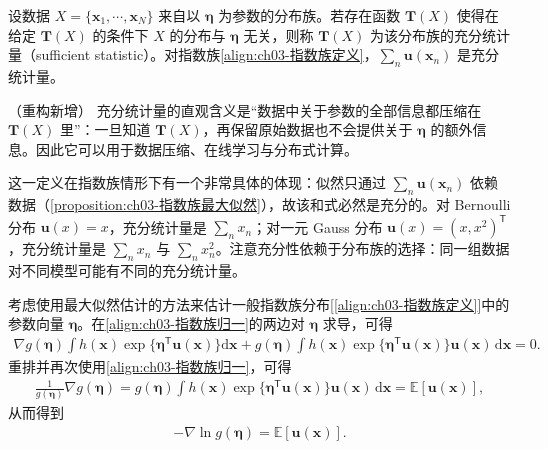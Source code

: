 \documentclass[../../main.tex]{subfiles}
\begin{document}
\begin{definition}[充分统计量]\label{definition:ch03-充分统计量}
设数据 $X=\{\boldsymbol{x}_1,\cdots,\boldsymbol{x}_N\}$ 来自以 $\boldsymbol{\eta}$ 为参数的分布族。若存在函数 $\boldsymbol{T}(X)$ 使得在给定 $\boldsymbol{T}(X)$ 的条件下 $X$ 的分布与 $\boldsymbol{\eta}$ 无关，则称 $\boldsymbol{T}(X)$ 为该分布族的充分统计量（sufficient statistic）。对指数族\eqref{align:ch03-指数族定义}，$\sum_{n}\boldsymbol{u}(\boldsymbol{x}_n)$ 是充分统计量。
\end{definition}

\begin{remark}（重构新增）
充分统计量的直观含义是“数据中关于参数的全部信息都压缩在 $\boldsymbol{T}(X)$ 里”：一旦知道 $\boldsymbol{T}(X)$，再保留原始数据也不会提供关于 $\boldsymbol{\eta}$ 的额外信息。因此它可以用于数据压缩、在线学习与分布式计算。

这一定义在指数族情形下有一个非常具体的体现：似然只通过 $\sum_n\boldsymbol{u}(\boldsymbol{x}_n)$ 依赖数据（\cref{proposition:ch03-指数族最大似然}），故该和式必然是充分的。对 Bernoulli 分布 $\boldsymbol{u}(x)=x$，充分统计量是 $\sum_n x_n$；对一元 Gauss 分布 $\boldsymbol{u}(x)=(x,x^{2})^{\mathsf{T}}$，充分统计量是 $\sum_n x_n$ 与 $\sum_n x_n^{2}$。注意充分性依赖于分布族的选择：同一组数据对不同模型可能有不同的充分统计量。
\end{remark}

考虑使用最大似然估计的方法来估计一般指数族分布[\eqref{align:ch03-指数族定义}]中的参数向量 $\boldsymbol{\eta}$。在\eqref{align:ch03-指数族归一}的两边对 $\boldsymbol{\eta}$ 求导，可得
\begin{align}
\nabla g(\boldsymbol{\eta})\int h(\boldsymbol{x})\exp\bigl\{\boldsymbol{\eta}^{\mathsf{T}}\boldsymbol{u}(\boldsymbol{x})\bigr\}\mathrm{d}\boldsymbol{x}+g(\boldsymbol{\eta})\int h(\boldsymbol{x})\exp\bigl\{\boldsymbol{\eta}^{\mathsf{T}}\boldsymbol{u}(\boldsymbol{x})\bigr\}\boldsymbol{u}(\boldsymbol{x})\,\mathrm{d}\boldsymbol{x}=0.
\label{align:ch03-指数族求导}
\end{align}
重排并再次使用\eqref{align:ch03-指数族归一}，可得
\begin{align}
\frac{1}{g(\boldsymbol{\eta})}\nabla g(\boldsymbol{\eta})=g(\boldsymbol{\eta})\int h(\boldsymbol{x})\exp\bigl\{\boldsymbol{\eta}^{\mathsf{T}}\boldsymbol{u}(\boldsymbol{x})\bigr\}\boldsymbol{u}(\boldsymbol{x})\,\mathrm{d}\boldsymbol{x}=\mathbb{E}[\boldsymbol{u}(\boldsymbol{x})],
\label{align:ch03-指数族矩推导}
\end{align}
从而得到
\begin{align}
-\nabla\ln g(\boldsymbol{\eta})=\mathbb{E}[\boldsymbol{u}(\boldsymbol{x})].
\label{align:ch03-指数族矩}
\end{align}
\end{document}
